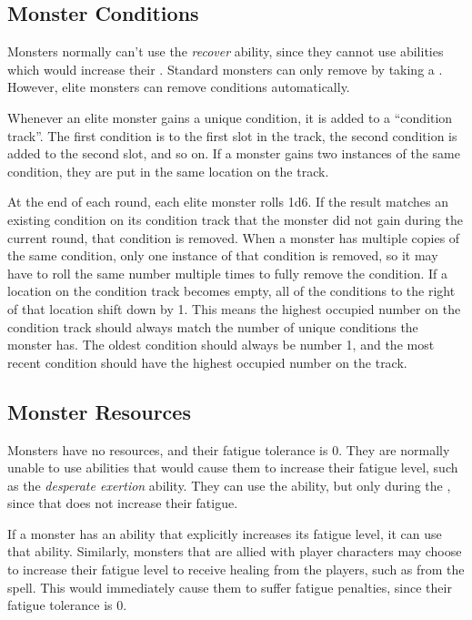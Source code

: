   \subsection{Monster Conditions}\label{Monster Conditions}
    Monsters normally can't use the \textit{recover} ability, since they cannot use abilities which would increase their .
    Standard monsters can only remove  by taking a .
    However, elite monsters can remove conditions automatically.

    Whenever an elite monster gains a unique condition, it is added to a ``condition track''.
    The first condition is to the first slot in the track, the second condition is added to the second slot, and so on.
    If a monster gains two instances of the same condition, they are put in the same location on the track.

    At the end of each round, each elite monster rolls 1d6.
    If the result matches an existing condition on its condition track that the monster did not gain during the current round, that condition is removed.
    When a monster has multiple copies of the same condition, only one instance of that condition is removed, so it may have to roll the same number multiple times to fully remove the condition.
    If a location on the condition track becomes empty, all of the conditions to the right of that location shift down by 1.
    This means the highest occupied number on the condition track should always match the number of unique conditions the monster has.
    The oldest condition should always be number 1, and the most recent condition should have the highest occupied number on the track.

  \subsection{Monster Resources}
    Monsters have no resources, and their fatigue tolerance is 0.
    They are normally unable to use abilities that would cause them to increase their fatigue level, such as the \textit{desperate exertion} ability.
    They can use the  ability, but only during the , since that does not increase their fatigue.

    If a monster has an ability that explicitly increases its fatigue level, it can use that ability.
    Similarly, monsters that are allied with player characters may choose to increase their fatigue level to receive healing from the players, such as from the  spell.
    This would immediately cause them to suffer fatigue penalties, since their fatigue tolerance is 0.

